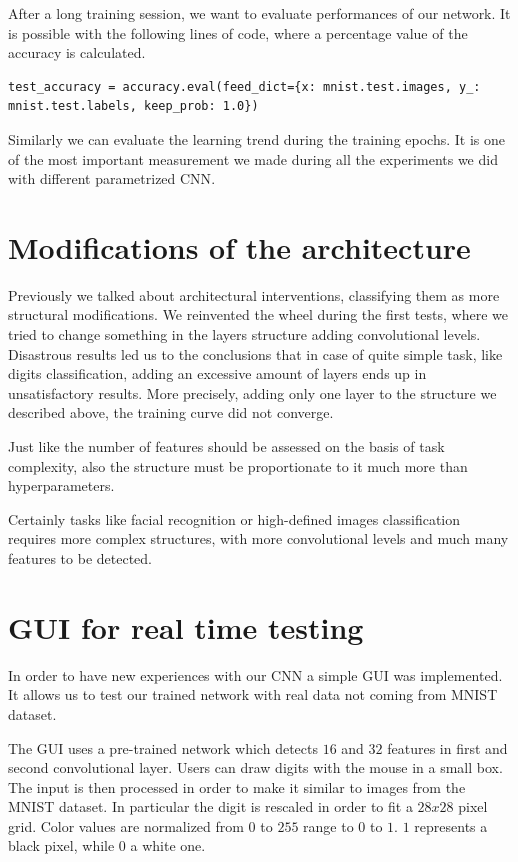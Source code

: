 After a long training session, we want to evaluate performances of our network. It is possible with the following lines of code, where a percentage value of the accuracy is calculated.

\begin{lstlisting}
test_accuracy = accuracy.eval(feed_dict={x: mnist.test.images, y_: mnist.test.labels, keep_prob: 1.0})
\end{lstlisting}

Similarly we can evaluate the learning trend during the training epochs. It is one of the most important measurement we made during all the experiments we did with different parametrized \acs{CNN}.

\section{Modifications of the architecture}

Previously we talked about architectural interventions, classifying them as more structural modifications. We reinvented the wheel during the first tests, where we tried to change something in the layers structure adding convolutional levels. Disastrous results led us to the conclusions that in case of quite simple task, like digits classification, adding an excessive amount of layers ends up in unsatisfactory results. More precisely, adding only one layer to the structure we described above, the training curve did not converge. 

Just like the number of features should be assessed on the basis of task complexity, also the structure must be proportionate to it much more than hyperparameters.

Certainly tasks like facial recognition or high-defined images classification requires more complex structures, with more convolutional levels and much many features to be detected.

\section{GUI for real time testing}

In order to have new experiences with our \acs{CNN} a simple \acs{GUI} was implemented. It allows us to test our trained network with real data not coming from \acs{MNIST} dataset.

The \acs{GUI} uses a pre-trained network which detects $16$ and $32$ features in first and second convolutional layer. Users can draw digits with the mouse in a small box. The input is then processed in order to make it similar to images from the \acs{MNIST} dataset. In particular the digit is rescaled in order to fit a $28x28$ pixel grid. Color values are normalized from $0$ to $255$ range to $0$ to $1$. $1$ represents a black pixel, while $0$ a white one.

